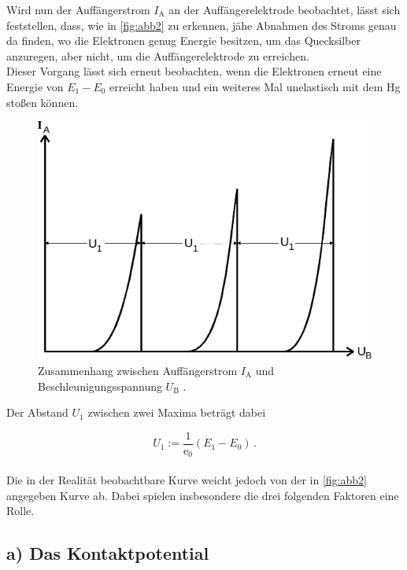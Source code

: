 Wird nun der Auffängerstrom $I_\text{A}$ an der Auffängerelektrode
beobachtet, lässt sich feststellen, dass, wie in \autoref{fig:abb2} zu erkennen,
jähe Abnahmen des Stroms genau da finden, wo die Elektronen genug Energie besitzen,
um das Quecksilber anzuregen, aber nicht, um die Auffängerelektrode zu erreichen. \\

Dieser Vorgang lässt sich erneut beobachten, wenn die Elektronen erneut
eine Energie von $E_1 - E_0$ erreicht haben und ein weiteres Mal unelastisch mit
dem Hg stoßen können.

\begin{figure}[H]
    \centering
    \includegraphics{figures/Abb_2.pdf}
    \caption{Zusammenhang zwischen Auffängerstrom $I_\text{A}$ und Beschleunigungsspannung $U_\text{B}$ \cite{ap08}.}
    \label{fig:abb2}
\end{figure}

Der Abstand $U_1$ zwischen zwei Maxima beträgt dabei

\begin{equation}
    U_1 := \frac{1}{\text{e}_0} (E_1 - E_0) \,.
\end{equation} \\

Die in der Realität beobachtbare Kurve weicht jedoch von der in \autoref{fig:abb2} angegeben Kurve ab.
Dabei spielen insbesondere die drei folgenden Faktoren eine Rolle.

\subsection*{a) Das Kontaktpotential}

